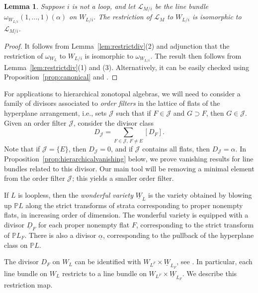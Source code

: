 \documentclass{amsart}
\newtheorem{lemma}[theorem]{Lemma}
\theoremstyle{definition}
\begin{document}
\begin{lemma}\label{lem:restrictLM}
Suppose $i$ is not a loop, and let $\mathcal{L}_{M/i}$ be the line bundle  $\omega_{W_{L/i}}(1,\dotsc, 1)(\alpha)$ on $W_{L/i}$. 
The restriction of $\mathcal{L}_M$ to $W_{L/i}$ is isomorphic to $\mathcal{L}_{M/i}$. 
\end{lemma}

\begin{proof}
It follows from Lemma~\ref{lem:restrictdiv}(2) and adjunction that the 
restriction of $\omega_{W_L}$ to $W_{L/i}$ is isomorphic to 
$\omega_{W_{L/i}}$. The result then follows from 
Lemma~\ref{lem:restrictdiv}(1) and (3). Alternatively, it can be easily 
checked using Proposition~\ref{prop:canonical} and \cite[Proposition 
2.28]{BHMPW20a}. 
\end{proof}

\medskip

For applications to hierarchical zonotopal algebras, we will need to consider a family of divisors associated to \emph{order filters} in the lattice of flats of the hyperplane arrangement, i.e., sets $\mathcal{J}$ such that if $F \in \mathcal{J}$ and $G \supset F$, then $G \in \mathcal{J}$. Given an order filter $\mathcal{J}$, consider the divisor class
\begin{equation}\label{eq:divisororder}
D_\mathcal{J} = \sum_{F \in \mathcal{J}, \, F \not= E} [D_F].  
\end{equation}
Note that if $\mathcal{J} = \{E\}$, then $D_{\mathcal{J}} = 0$, and if $\mathcal{J}$ contains all flats, then $D_{\mathcal{J}} = \alpha$. 
In Proposition~\ref{prop:hierarchicalvanishing} below, we prove vanishing results for line bundles related to this divisor. Our main tool will be removing a minimal element from the order filter $\mathcal{J}$; this yields a smaller order filter. 

If $L$ is loopless, then the \emph{wonderful variety} $\underline{W}_L$ is the variety obtained by blowing up $\mathbb{P}L$ along the strict transforms of strata corresponding to proper nonempty flats, in increasing order of dimension. The wonderful variety is equipped with a divisor $\underline{D}_F$ for each proper nonempty flat $F$, corresponding to the strict transform of $\mathbb{P}L_F$. There is also a divisor $\underline{\alpha}$, corresponding to the pullback of the hyperplane class on $\mathbb{P}L$. 


The divisor $D_F$ on $W_L$ can be identified with $W_{L^F} \times \underline{W}_{L_F}$, see \cite[Proposition 2.7]{BHMPW20a}. In particular, each line bundle on $W_{L}$ restricts to a line bundle on $W_{L^F} \times \underline{W}_{L_F}$. We describe this restriction map. 
\end{document}
